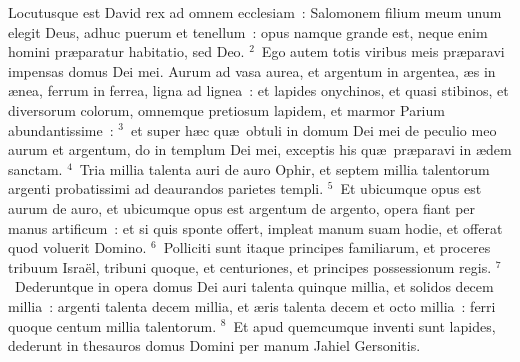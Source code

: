 \bchapter
\lettrine[lines=3,image=true,loversize=0.05,lraise=-0.03]{L}{}ocutusque est David rex ad omnem ecclesiam~: Salomonem filium meum unum elegit Deus, adhuc puerum et tenellum~: opus namque grande est, neque enim homini pr\ae paratur habitatio, sed Deo.
${}^{2}$~Ego autem totis viribus meis pr\ae paravi impensas domus Dei mei. Aurum ad vasa aurea, et argentum in argentea, \ae s in \ae nea, ferrum in ferrea, ligna ad lignea~: et lapides onychinos, et quasi stibinos, et diversorum colorum, omnemque pretiosum lapidem, et marmor Parium abundantissime~:
${}^{3}$~et super h\ae c qu\ae\ obtuli in domum Dei mei de peculio meo aurum et argentum, do in templum Dei mei, exceptis his qu\ae\ pr\ae paravi in \ae dem sanctam.
${}^{4}$~Tria millia talenta auri de auro Ophir, et septem millia talentorum argenti probatissimi ad deaurandos parietes templi.
${}^{5}$~Et ubicumque opus est aurum de auro, et ubicumque opus est argentum de argento, opera fiant per manus artificum~: et si quis sponte offert, impleat manum suam hodie, et offerat quod voluerit Domino.
${}^{6}$~Polliciti sunt itaque principes familiarum, et proceres tribuum Isra\"el, tribuni quoque, et centuriones, et principes possessionum regis.
${}^{7}$~Dederuntque in opera domus Dei auri talenta quinque millia, et solidos decem millia~: argenti talenta decem millia, et \ae ris talenta decem et octo millia~: ferri quoque centum millia talentorum.
${}^{8}$~Et apud quemcumque inventi sunt lapides, dederunt in thesauros domus Domini per manum Jahiel Gersonitis.



